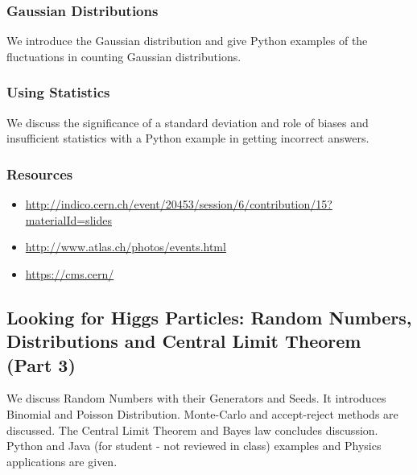 
\subsubsection{Gaussian Distributions}\label{gaussian-distributions}

We introduce the Gaussian distribution and give Python examples of the
fluctuations in counting Gaussian distributions.


\subsubsection{Using Statistics}\label{using-statistics}

We discuss the significance of a standard deviation and role of biases
and insufficient statistics with a Python example in getting incorrect
answers.


\subsubsection{Resources}\label{resources-2}

\begin{itemize}
\tightlist
\item
  \url{http://indico.cern.ch/event/20453/session/6/contribution/15?materialId=slides}
\item
  \url{http://www.atlas.ch/photos/events.html}
\item
  \url{https://cms.cern/}
\end{itemize}

\subsection{Looking for Higgs Particles: Random Numbers, Distributions
and Central Limit Theorem (Part
3)}\label{looking-for-higgs-particles-random-numbers-distributions-and-central-limit-theorem-part-3}

We discuss Random Numbers with their Generators and Seeds. It introduces
Binomial and Poisson Distribution. Monte-Carlo and accept-reject methods
are discussed. The Central Limit Theorem and Bayes law concludes
discussion. Python and Java (for student - not reviewed in class)
examples and Physics applications are given.

